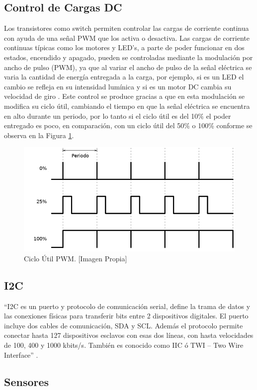 \subsection{Control de Cargas DC}

Los transistores como switch permiten controlar las cargas de corriente continua con ayuda de una señal PWM que los activa o desactiva. Las cargas de corriente continuas típicas como los motores y LED's, a parte de poder funcionar en dos estados, encendido y apagado, pueden se controladas mediante la modulación por ancho de pulso (PWM), ya que al variar el ancho de pulso de la señal eléctrica se varia la cantidad de energía entregada a la carga, por ejemplo, si es un LED el cambio se refleja en su intensidad lumínica y si es un motor DC cambia su velocidad de giro \cite{PWM}. Este control se produce gracias a que en esta modulación se modifica su ciclo útil, cambiando el tiempo en que la señal eléctrica se encuentra en alto durante un periodo, por lo tanto si el ciclo útil es del 10\% el poder entregado es poco, en comparación, con un ciclo útil del 50\% o 100\% conforme se observa en la Figura \ref{fig:pwm-duty-800x396}.

\begin{figure}[H]
	\centering
	\caption{Ciclo Útil PWM. [Imagen Propia] }
	\label{fig:pwm-duty-800x396}
	\includegraphics[width=0.5\linewidth]{Imagenes/pwm}
\end{figure}


\subsection{I2C}

``I2C es un puerto y protocolo de comunicación serial, define la trama de datos y las conexiones físicas para transferir bits entre 2 dispositivos digitales. El puerto incluye dos cables de comunicación, SDA y SCL. Además el protocolo permite conectar hasta 127 dispositivos esclavos con esas dos líneas, con hasta velocidades de 100, 400 y 1000 kbits/s. También es conocido como IIC ó TWI – Two Wire Interface'' \cite{I2C}.

\subsection{Sensores}\label{sec:sensors}

